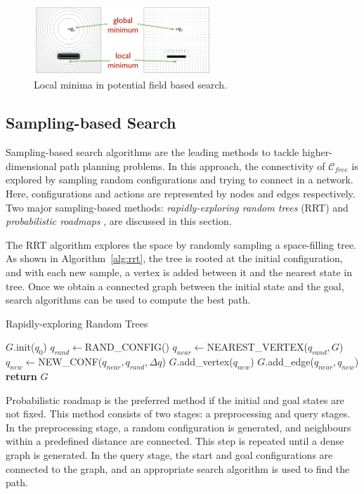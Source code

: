 \begin{figure}
\centering
\includegraphics[width=0.6\textwidth]{./images/potential_search}
\caption[Local minima in potential field based search]{Local minima in potential field based search. \cite{siciliano2010robotics}}
\label{fig:potential_search}
\end{figure}


\subsection{Sampling-based Search}
\label{sec:sampling_search}
Sampling-based search algorithms are the leading methods to tackle higher-dimensional path planning problems. In this approach, the connectivity of $\mathcal{C}_{free}$ is explored by sampling random configurations and trying to connect in a network. Here, configurations and actions are represented by nodes and edges respectively. Two major sampling-based methods: \textit{rapidly-exploring random trees} (RRT) \cite{lavalle2006planning} and \textit{probabilistic roadmaps} \cite{kavraki1994probabilistic}, are discussed in this section.

The RRT algorithm explores the space by randomly sampling a space-filling tree. As shown in Algorithm~\ref{alg:rrt}, the tree is rooted at the initial configuration, and with each new sample, a vertex is added between it and the nearest state in tree. Once we obtain a connected graph between the initial state and the goal, search algorithms can be used to compute the best path. 

\begin{algorithm}
\caption{Rapidly-exploring Random Trees}\label{alg:rrt}
\begin{algorithmic}[1]
\State $G$.init($q_0$)
\State $q_{rand}\gets$RAND\_CONFIG()
\State $q_{near}\gets$NEAREST\_VERTEX($q_{rand},G$)
\State $q_{new}\gets$NEW\_CONF($q_{near}, q_{rand}, \Delta q$)
\State $G$.add\_vertex($q_{new}$)
\State $G$.add\_edge($q_{near},q_{new}$)
\EndFor
\State \textbf{return} $G$

\end{algorithmic}
\end{algorithm}
Probabilistic roadmap is the preferred method if the initial and goal states are not fixed. This method consists of two stages: a preprocessing and query stages. In the preprocessing stage, a random configuration is generated, and neighbours within a predefined distance are connected. This step is repeated until a dense graph is generated. In the query stage, the start and goal configurations are connected to the graph, and an appropriate search algorithm is used to find the path. 


